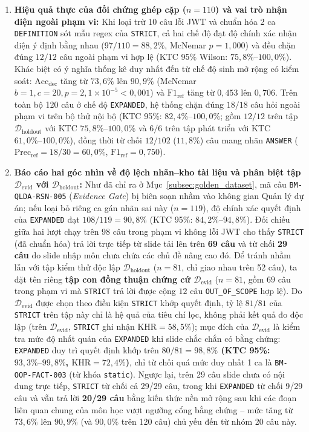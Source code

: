 \documentclass{IEEEtran}
\begin{document}
\begin{enumerate}
    \item \textbf{Hiệu quả thực của đối chứng ghép cặp ($n=110$) và vai trò nhận diện ngoài phạm vi:} Khi loại trừ 10 câu lỗi JWT và chuẩn hóa 2 ca \texttt{DEFINITION} sót mẫu regex của \texttt{STRICT}, cả hai chế độ đạt độ chính xác nhận diện ý định bằng nhau ($97/110 = 88{,}2\%$, McNemar $p = 1{,}000$) và đều chặn đúng $12/12$ câu ngoài phạm vi hợp lệ (KTC 95\% Wilson: $75{,}8\%\text{--}100{,}0\%$). Khác biệt có ý nghĩa thống kê duy nhất đến từ chế độ sinh mở rộng có kiểm soát: $\text{Acc}_{\text{dec}}$ tăng từ $73{,}6\%$ lên $90{,}9\%$ (McNemar $b=1, c=20, p = 2{,}1\times 10^{-5} < 0{,}001$) và $\text{F1}_{\text{ref}}$ tăng từ $0{,}453$ lên $0{,}706$. Trên toàn bộ 120 câu ở chế độ \texttt{EXPANDED}, hệ thống chặn đúng $18/18$ câu hỏi ngoài phạm vi trên bộ thử nội bộ (KTC 95\%: $82{,}4\%\text{--}100{,}0\%$; gồm $12/12$ trên tập $\mathcal{D}_{\text{holdout}}$ với KTC $75{,}8\%\text{--}100{,}0\%$ và $6/6$ trên tập phát triển với KTC $61{,}0\%\text{--}100{,}0\%$), đồng thời từ chối $12/102$ ($11{,}8\%$) câu mang nhãn \texttt{ANSWER} ($\text{Prec}_{\text{ref}} = 18/30 = 60{,}0\%$, $\text{F1}_{\text{ref}} = 0{,}750$).
    \item \textbf{Báo cáo hai góc nhìn về độ lệch nhãn--kho tài liệu và phân biệt tập $\mathcal{D}_{\text{evid}}$ với $\mathcal{D}_{\text{holdout}}$:} Như đã chỉ ra ở Mục~\ref{subsec:golden_dataset}, mã câu \texttt{BM-QLDA-RSN-005} (\textit{Evidence Gate}) bị biên soạn nhầm vào không gian Quản lý dự án; nếu loại bỏ riêng ca gán nhãn sai này ($n=119$), độ chính xác quyết định của \texttt{EXPANDED} đạt $108/119 = 90{,}8\%$ (KTC 95\%: $84{,}2\%\text{--}94{,}8\%$). Đối chiếu giữa hai lượt chạy trên 98 câu trong phạm vi không lỗi JWT cho thấy \texttt{STRICT} (đã chuẩn hóa) trả lời trực tiếp từ slide tải lên trên \textbf{69 câu} và từ chối \textbf{29 câu} do slide nhập môn chưa chứa các chủ đề nâng cao đó. Để tránh nhầm lẫn với tập kiểm thử độc lập $\mathcal{D}_{\text{holdout}}$ ($n=81$, chỉ giao nhau trên 52 câu), ta đặt tên riêng \textbf{tập con đồng thuận chứng cứ $\mathcal{D}_{\text{evid}}$} ($n=81$, gồm $69$ câu trong phạm vi mà \texttt{STRICT} trả lời được cộng $12$ câu \texttt{OUT\_OF\_SCOPE} hợp lệ). Do $\mathcal{D}_{\text{evid}}$ được chọn theo điều kiện \texttt{STRICT} khớp quyết định, tỷ lệ $81/81$ của \texttt{STRICT} trên tập này chỉ là hệ quả của tiêu chí lọc, không phải kết quả đo độc lập (trên $\mathcal{D}_{\text{evid}}$, \texttt{STRICT} ghi nhận $\text{KHR}=58{,}5\%$); mục đích của $\mathcal{D}_{\text{evid}}$ là kiểm tra mức độ nhất quán của \texttt{EXPANDED} khi slide chắc chắn có bằng chứng: \texttt{EXPANDED} duy trì quyết định khớp trên \textbf{$80/81 = 98{,}8\%$ (KTC 95\%: $93{,}3\%\text{--}99{,}8\%$, $\text{KHR}=72{,}4\%$)}, chỉ từ chối quá mức duy nhất 1 ca là \texttt{BM-OOP-FACT-003} (từ khóa \texttt{static}). Ngược lại, trên 29 câu slide chưa có nội dung trực tiếp, \texttt{STRICT} từ chối cả 29/29 câu, trong khi \texttt{EXPANDED} từ chối 9/29 câu và vẫn trả lời \textbf{20/29 câu} bằng kiến thức nền mở rộng sau khi các đoạn liên quan chung của môn học vượt ngưỡng cổng bằng chứng -- mức tăng từ $73{,}6\%$ lên $90{,}9\%$ (và $90{,}0\%$ trên 120 câu) chủ yếu đến từ nhóm 20 câu này.

\end{enumerate}
\end{document}
